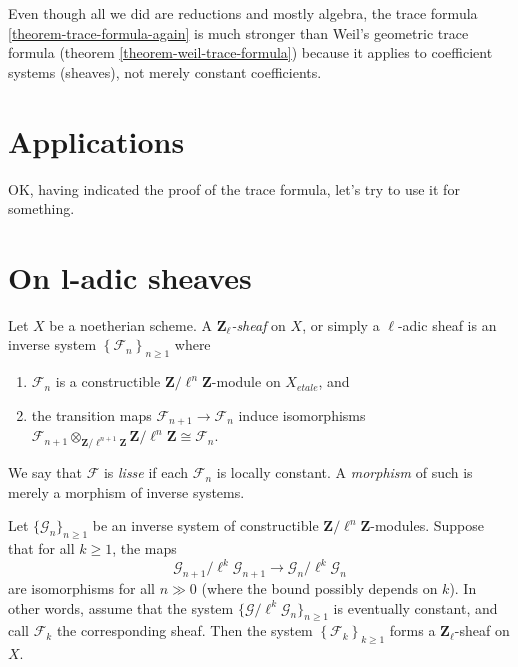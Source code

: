 \begin{remark}
\label{remark-stronger}
Even though all we did are reductions and mostly algebra, the trace formula
\ref{theorem-trace-formula-again} is much stronger than Weil's geometric trace
formula (theorem \ref{theorem-weil-trace-formula})
because it applies to coefficient
systems (sheaves), not merely constant coefficients.
\end{remark}


\section{Applications}
\label{section-applications}

\noindent
OK, having indicated the proof of the trace formula, let's try to use it
for something.





\section{On l-adic sheaves}
\label{section-l-adic-sheaves}

\begin{definition}
\label{definition-l-adic-sheaf}
Let $X$ be a noetherian scheme. A
{\it $\mathbf{Z}_\ell$-sheaf} on $X$, or simply a
{$\ell$-adic sheaf} is an
inverse system $\left\{\mathcal{F}_n\right\}_{n\geq 1}$ where
\begin{enumerate}
\item
$\mathcal{F}_n$ is a constructible $\mathbf{Z}/\ell^n\mathbf{Z}$-module on
$X_{etale}$, and
\item
the transition maps $\mathcal{F}_{n+1}\to \mathcal{F}_n$ induce isomorphisms
$\mathcal{F}_{n+1}\otimes_{\mathbf{Z}/\ell^{n+1}\mathbf{Z}}
\mathbf{Z}/\ell^n\mathbf{Z} \cong \mathcal{F}_n$.
\end{enumerate}
We say that $\mathcal{F}$ is {\it lisse} if each $\mathcal{F}_n$ is locally
constant. A {\it morphism} of such is merely a morphism of inverse systems.
\end{definition}

\begin{lemma}
\label{lemma-eventually-constant}
Let $\{\mathcal{G}_n\}_{n\geq 1}$ be an inverse system of constructible
$\mathbf{Z}/\ell^n\mathbf{Z}$-modules.
Suppose that for all $k\geq 1$, the maps
$$
\mathcal{G}_{n+1}/\ell^k \mathcal{G}_{n+1}\to \mathcal{G}_n /\ell^k
\mathcal{G}_n
$$
are isomorphisms for all $n\gg 0$ (where the bound possibly depends on $k$).
In other words, assume that the system
$\{\mathcal{G}/\ell^k\mathcal{G}_n\}_{n\geq 1}$
is eventually constant, and call $\mathcal{F}_k$ the corresponding sheaf.
Then the system $\left\{\mathcal{F}_k\right\}_{k\geq 1}$ forms a
$\mathbf{Z}_\ell$-sheaf on $X$.
\end{lemma}

